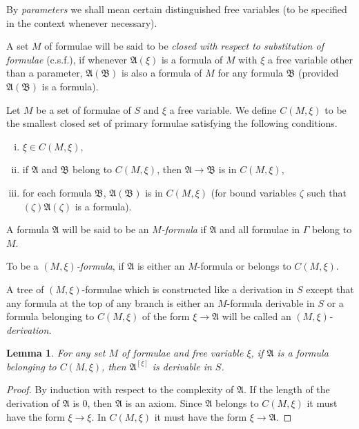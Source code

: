 \documentclass[12pt,a4paper]{article}
\newtheorem{lemma}{Lemma}
\begin{document}
By \emph{parameters} we shall mean certain distinguished free variables (to be
specified in the context whenever necessary).

A set $M$ of formulae will be said to be \emph{closed with respect to
substitution of formulae} (c.s.f.), if whenever $\mathfrak{A}(\xi)$ is a
formula of $M$ with $\xi$ a free variable other than a parameter,
$\mathfrak{A}(\mathfrak{B})$ is also a formula of $M$ for any formula
$\mathfrak{B}$ (provided $\mathfrak{A}(\mathfrak{B})$ is a formula).

Let $M$ be a set of formulae of $S$ and $\xi$ a free variable. We define
$C(M, \xi)$ to be the smallest closed set of primary formulae satisfying the
following conditions.
\begin{enumerate}[(i)]
\item $\xi \in C(M, \xi)$,
\item if $\mathfrak{A}$ and $\mathfrak{B}$ belong to $C(M, \xi)$, then
  $\mathfrak{A} \to \mathfrak{B}$ is in $C(M, \xi)$,
\item for each formula $\mathfrak{B}$, $\mathfrak{A}(\mathfrak{B})$ is in
  $C(M, \xi)$ (for bound variables $\zeta$ such that
  $(\zeta)\mathfrak{A}(\zeta)$ is a formula).
\end{enumerate}

A formula $\mathfrak{A}$ will be said to be an \emph{$M$-formula} if
$\mathfrak{A}$ and all formulae in $\Gamma$ belong to $M$.

To be a \emph{$(M,\xi)$-formula}, if $\mathfrak{A}$ is either an
$M$-formula or belongs to $C(M, \xi)$.

A tree of $(M,\xi)$-formulae which is constructed like a derivation in $S$
except that any formula at the top of any branch is either an $M$-formula
derivable in $S$ or a formula belonging to $C(M, \xi)$ of the form
$\xi \to \mathfrak{A}$ will be called an \emph{$(M,\xi)$-derivation}.

\begin{lemma}
For any set $M$ of formulae and free variable $\xi$, if $\mathfrak{A}$ is a
formula belonging to $C(M, \xi)$, then $\mathfrak{A}^{[\xi]}$ is derivable
in $S$.
\end{lemma}

\begin{proof}
By induction with respect to the complexity of $\mathfrak{A}$.
If the length of the derivation of $\mathfrak{A}$ is $0$, then $\mathfrak{A}$
is an axiom. Since $\mathfrak{A}$ belongs to $C(M,\xi)$ it must have the form
$\xi \to \xi$. In $C(M,\xi)$ it must have the form $\xi \to \mathfrak{A}$.
\end{proof}
\end{document}
